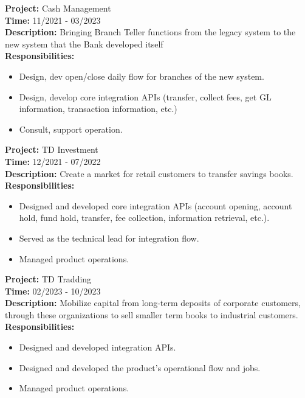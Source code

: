 \documentclass[11pt,a4paper,sans]{moderncv}
\begin{document}
\begin{mdframed}[style=ProjectFrame]
	\textbf{Project:} Cash Management \\
	\textbf{Time:} 11/2021 - 03/2023 \\
	\textbf{Description:} Bringing Branch Teller functions from the legacy system to the new system that the Bank developed itself\\
	\textbf{Responsibilities:}
	\begin{itemize}[leftmargin=0.6cm,noitemsep,topsep=0pt,label=-]
	\item Design, dev open/close daily flow for branches of the new system.
	\item Design, develop core integration APIs (transfer, collect fees, get GL information, transaction information, etc.)
	\item Consult, support operation.
	\end{itemize}
\end{mdframed}

\begin{mdframed}[style=ProjectFrame]
	\textbf{Project:} TD Investment \\
	\textbf{Time:} 12/2021 - 07/2022 \\
	\textbf{Description:} Create a market for retail customers to transfer savings books.\\
	\textbf{Responsibilities:}
	\begin{itemize}[leftmargin=0.6cm,noitemsep,topsep=0pt,label=-]
		\item Designed and developed core integration APIs (account opening, account hold, fund hold, transfer, fee collection, information retrieval, etc.).
		\item Served as the technical lead for integration flow.
		\item Managed product operations.
	\end{itemize}
\end{mdframed}

\begin{mdframed}[style=ProjectFrame]
	\textbf{Project:} TD Tradding\\
	\textbf{Time:} 02/2023 - 10/2023 \\
	\textbf{Description:} Mobilize capital from long-term deposits of corporate customers, through these organizations to sell smaller term books to industrial customers.\\
	\textbf{Responsibilities:}
	\begin{itemize}[leftmargin=0.6cm,noitemsep,topsep=0pt,label=-]
		\item Designed and developed integration APIs.
		\item Designed and developed the product's operational flow and jobs.
		\item Managed product operations.
	\end{itemize}
\end{mdframed}
\end{document}
